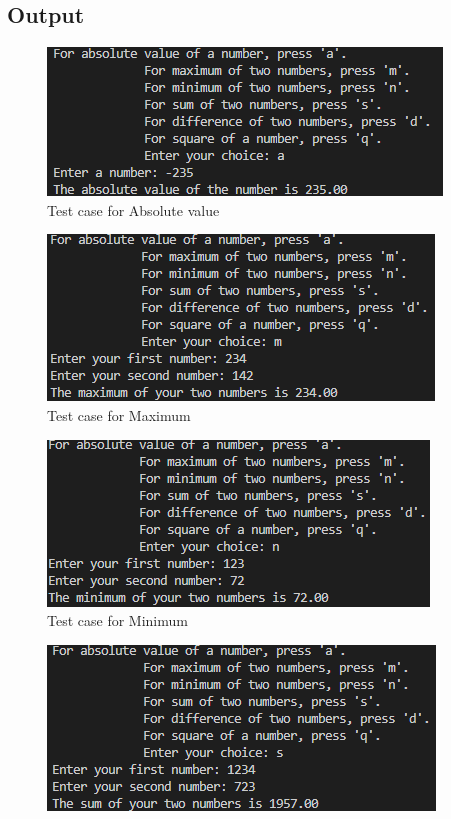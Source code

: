 \documentclass{article}
\begin{document}
\begin{flushleft}
  \section{Output}
  \begin{figure}[!h]
    \begin{centering}
      \includegraphics[scale=1]{Q2_p1.png}
      \caption{Test case for Absolute value}
    \end{centering}
  \end{figure}
  \begin{figure}[!h]
    \begin{centering}
      \includegraphics[scale=1]{Q2_p2.png}
      \caption{Test case for Maximum}
    \end{centering}
  \end{figure}
  \begin{figure}[!h]
    \begin{centering}
      \includegraphics[scale=1]{Q2_p3.png}
      \caption{Test case for Minimum}
    \end{centering}
  \end{figure}
  \begin{figure}[!h]
    \begin{centering}
      \includegraphics[scale=1]{Q2_p4.png}

\end{centering}
\end{figure}
\end{flushleft}
\end{document}
